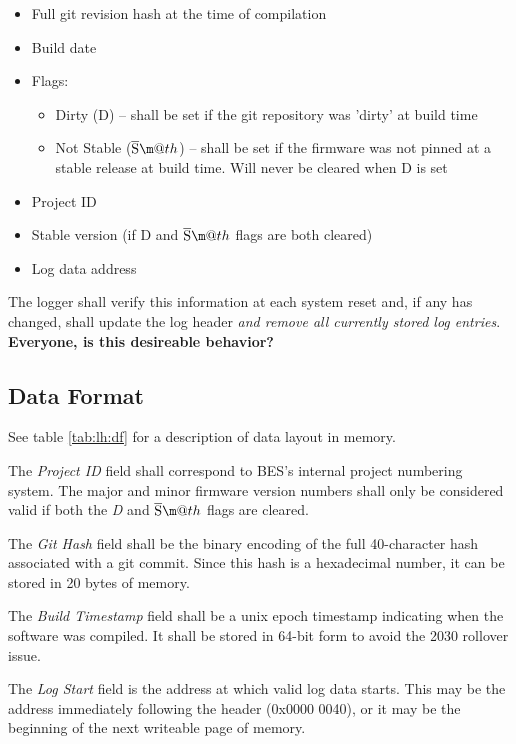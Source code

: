 \documentclass[paper=letter, fontsize=10pt]{scrartcl} %
\makeatletter
\newcommand*{\textoverline}[1]{$\overline{\hbox{#1}}\m@th$}
\numberwithin{equation}{section} %
\numberwithin{figure}{section} %
\numberwithin{table}{section} %
\makeatother
\begin{document}
\begin{itemize}
    \item{Full git revision hash at the time of compilation}
    \item{Build date}
    \item{Flags:}
        \begin{itemize}
            \item{Dirty (D) -- shall be set if the git repository was 'dirty' at
                  build time}
              \item{Not Stable (\textoverline{S}) -- shall be set if the
                    firmware was not pinned at a stable release at build time.
                    Will never be cleared when D is set}
        \end{itemize}
    \item{Project ID}
    \item{Stable version (if D and \textoverline{S} flags are both cleared)}
    \item{Log data address}
\end{itemize}

The logger shall verify this information at each system reset and, if any has
changed, shall update the log header \emph{and remove all currently stored log
entries}.  \textbf{Everyone, is this desireable behavior?}

\subsection{Data Format} \label{sec:lh:df}

\newcommand{\magicnumberhx}{0x6C6F67}
\newcommand{\versionhx}{0x01}

See table \ref{tab:lh:df} for a description of data layout in memory.

The \emph{Project ID} field shall correspond to BES's internal project numbering
system. The major and minor firmware version numbers shall only be considered
valid if both the \emph{D} and \emph{\textoverline{S}} flags are cleared.

The \emph{Git Hash} field shall be the binary encoding of the full 40-character
hash associated with a git commit. Since this hash is a hexadecimal number, it
can be stored in 20 bytes of memory.

The \emph{Build Timestamp} field shall be a unix epoch timestamp indicating when
the software was compiled. It shall be stored in 64-bit form to avoid the 2030
rollover issue.

The \emph{Log Start} field is the address at which valid log data starts. This
may be the address immediately following the header (0x0000 0040), or it may be
the beginning of the next writeable page of memory.
\end{document}
